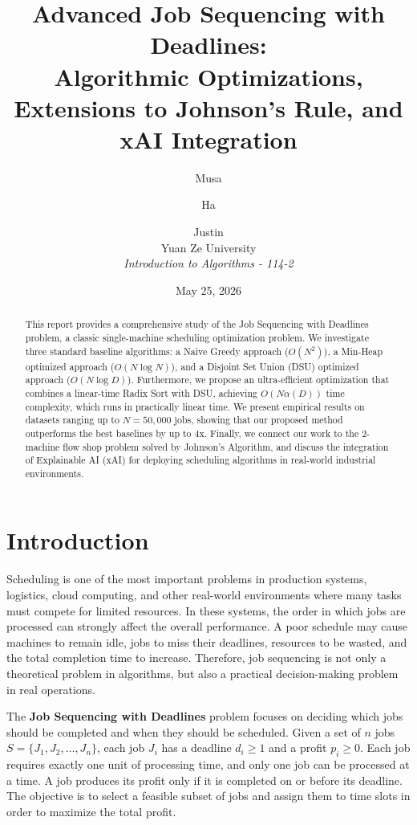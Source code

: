 \documentclass[11pt,a4paper]{article}
\title{Advanced Job Sequencing with Deadlines:\\Algorithmic Optimizations, Extensions to Johnson's Rule, and xAI Integration}
\author{Musa \and Ha \and Justin \\ \medskip Yuan Ze University \\ \textit{Introduction to Algorithms - 114-2}}
\date{May 25, 2026}
\begin{document}
\maketitle

\begin{abstract}
This report provides a comprehensive study of the Job Sequencing with Deadlines problem, a classic single-machine scheduling optimization problem. We investigate three standard baseline algorithms: a Naive Greedy approach ($O(N^2)$), a Min-Heap optimized approach ($O(N \log N)$), and a Disjoint Set Union (DSU) optimized approach ($O(N \log D)$). Furthermore, we propose an ultra-efficient optimization that combines a linear-time Radix Sort with DSU, achieving $O(N \alpha(D))$ time complexity, which runs in practically linear time. We present empirical results on datasets ranging up to $N = 50,000$ jobs, showing that our proposed method outperforms the best baselines by up to 4x. Finally, we connect our work to the 2-machine flow shop problem solved by Johnson's Algorithm, and discuss the integration of Explainable AI (xAI) for deploying scheduling algorithms in real-world industrial environments.
\end{abstract}

\section{Introduction}

Scheduling is one of the most important problems in production systems, logistics, cloud computing, and other real-world environments where many tasks must compete for limited resources. In these systems, the order in which jobs are processed can strongly affect the overall performance. A poor schedule may cause machines to remain idle, jobs to miss their deadlines, resources to be wasted, and the total completion time to increase. Therefore, job sequencing is not only a theoretical problem in algorithms, but also a practical decision-making problem in real operations.

The \textbf{Job Sequencing with Deadlines} problem focuses on deciding which jobs should be completed and when they should be scheduled. Given a set of $n$ jobs $S = \{J_1, J_2, \dots, J_n\}$, each job $J_i$ has a deadline $d_i \ge 1$ and a profit $p_i \ge 0$. Each job requires exactly one unit of processing time, and only one job can be processed at a time. A job produces its profit only if it is completed on or before its deadline. The objective is to select a feasible subset of jobs and assign them to time slots in order to maximize the total profit.
\end{document}
